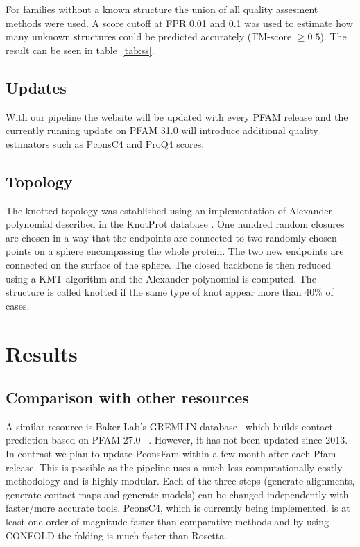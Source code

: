 \documentclass[a4,center,fleqn]{NAR}
\begin{document}
For families without a known structure the union of all quality assesment methods were used.
A score cutoff at FPR 0.01 and 0.1 was used to estimate how many unknown structures
could be predicted accurately (TM-score $\ge 0.5$). The result can be seen in table~\ref{tab:ss}.
\subsection{Updates}

With our pipeline the website will be updated with every PFAM release
and the currently running update on PFAM 31.0 will introduce
additional quality estimators such as PconsC4 and ProQ4
scores. 

\subsection{Topology}
The knotted topology was established using an implementation of Alexander polynomial described in the KnotProt database \cite{jamroz2014knotprot}. One hundred random closures are chosen in a way that the endpoints are connected to two randomly 
chosen points on a sphere encompassing the whole protein. The two new endpoints are 
connected on the surface of the sphere. The closed backbone is then reduced using a
KMT algorithm and the Alexander polynomial is computed. The structure is called knotted if the same type of knot
appear more than 40\% of cases. 

\section{Results}

\subsection{Comparison with other resources}

A similar resource is Baker Lab’s GREMLIN database~\cite{Kamisetty2013} which builds contact prediction based on
PFAM 27.0~\cite{Sonnhammer:1997} . However, it has not been updated since
2013. In contrast we plan to update PconsFam within a few month after
each Pfam release. This is possible as the pipeline uses a much less
computationally costly methodology and is highly modular. Each of the three steps
(generate alignments, generate contact maps and generate models) can be changed
independently with faster/more accurate tools. PconsC4, which is currently
being implemented, is at least one order of
magnitude faster than comparative methods and by using CONFOLD the
folding is much faster than Rosetta.
\end{document}
